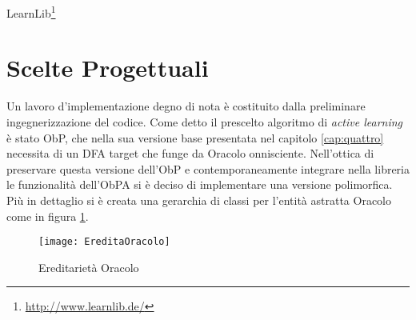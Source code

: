 LearnLib\footnote{\href{http://www.learnlib.de/}{http://www.learnlib.de/}}




\section{Scelte Progettuali}
Un lavoro d'implementazione degno di nota è costituito dalla preliminare ingegnerizzazione del codice. Come detto il prescelto algoritmo di \textit{active learning} è stato \ac{ObP}, che nella sua versione base presentata nel capitolo \ref{cap:quattro} necessita di un \ac{DFA} target che funge da Oracolo onnisciente. Nell'ottica di preservare questa versione dell'\ac{ObP} e contemporaneamente integrare nella libreria le funzionalità dell'\ac{ObPA} si è deciso di implementare una versione polimorfica. Più in dettaglio si è creata una gerarchia di classi per l'entità astratta Oracolo come in figura \ref{fig:eor}.
\begin{figure}[htp]
	\centering
	\texttt{[image: EreditaOracolo]}
	\caption[Ereditarietà Oracolo]{Ereditarietà Oracolo}
   \label{fig:eor}
\end{figure}

